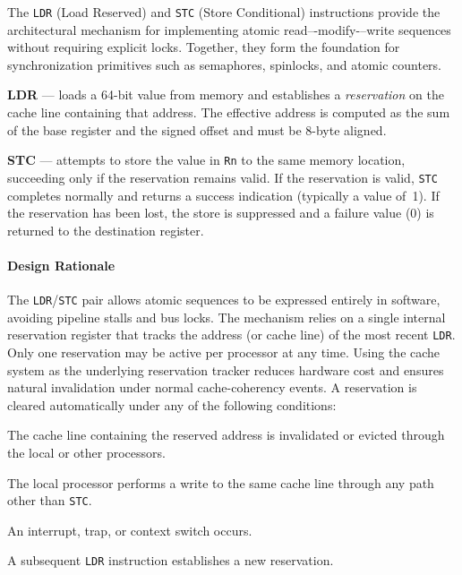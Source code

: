 
The \texttt{LDR} (Load Reserved) and \texttt{STC} (Store Conditional) instructions provide the architectural mechanism for implementing atomic read–-modify-–write sequences without requiring explicit locks. Together, they form the foundation for synchronization primitives such as semaphores, spinlocks, and atomic counters.

\begin{smallGapItemize}
  \item \textbf{LDR} — loads a 64-bit value from memory and establishes a \emph{reservation} on the cache line containing that address. The effective address is computed as the sum of the base register and the signed offset and must be 8-byte aligned.   
  \item \textbf{STC} — attempts to store the value in \texttt{Rn} to the same memory location, succeeding only if the reservation remains valid. If the reservation is valid, \texttt{STC} completes normally and returns a success indication (typically a value of~1). If the reservation has been lost, the store is suppressed and a failure value (0) is returned to the destination register.
\end{smallGapItemize}

\paragraph{Design Rationale}

The \texttt{LDR}/\texttt{STC} pair allows atomic sequences to be expressed entirely in software, avoiding pipeline stalls and bus locks.  
The mechanism relies on a single internal reservation register that tracks the address (or cache line) of the most recent \texttt{LDR}. Only one reservation may be active per processor at any time. Using the cache system as the underlying reservation tracker reduces hardware cost and ensures natural invalidation under normal cache-coherency events. A reservation is cleared automatically under any of the following conditions:

\begin{smallGapItemize}
  \item The cache line containing the reserved address is invalidated or evicted through the local or other processors.
  \item The local processor performs a write to the same cache line through any path other than \texttt{STC}.
  \item An interrupt, trap, or context switch occurs.
  \item A subsequent \texttt{LDR} instruction establishes a new reservation.
\end{smallGapItemize}

